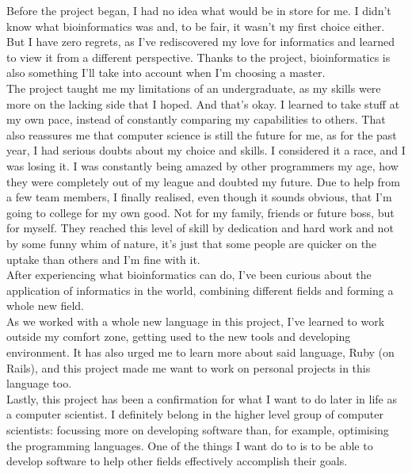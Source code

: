 	Before the project began, I had no idea what would be in store for me. I didn't know what bioinformatics was and, to be fair, it wasn't my first choice either. But I have zero regrets, as I've rediscovered my love for informatics and learned to view it from a different perspective. Thanks to the project, bioinformatics is also something I'll take into account when I'm choosing a master.\\

	The project taught me my limitations of an undergraduate, as my skills were more on the lacking side that I hoped. And that's okay. I learned to take stuff at my own pace, instead of constantly comparing my capabilities to others. That also reassures me that computer science is still the future for me, as for the past year, I had serious doubts about my choice and skills. I considered it a race, and I was losing it. I was constantly being amazed by other programmers my age, how they were completely out of my league and doubted my future. Due to help from a few team members, I finally realised, even though it sounds obvious, that I'm going to college for my own good. Not for my family, friends or future boss, but for myself. They reached this level of skill by dedication and hard work and not by some funny whim of nature, it's just that some people are quicker on the uptake than others and I'm fine with it.\\

	After experiencing what bioinformatics can do, I've been curious about the application of informatics in the world, combining different fields and forming a whole new field.\\

	As we worked with a whole new language in this project, I've learned to work outside my comfort zone, getting used to the new tools and developing environment. It has also urged me to learn more about said language, Ruby (on Rails), and this project made me want to work on personal projects in this language too.\\

	Lastly, this project has been a confirmation for what I want to do later in life as a computer scientist. I definitely belong in the higher level group of computer scientists: focussing more on developing software than, for example, optimising the programming languages. One of the things I want do to is to be able to develop software to help other fields effectively accomplish their goals.
